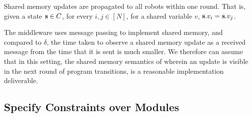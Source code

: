 \begin{assumption}
    \label{shared}
    Shared memory updates are propagated to all robots within one round. That is, given a state ${\textbf{s}}\in C$, for every  $i,j \in [N]$, for a shared variable $v$, ${\textbf{s}}.v_i = {\textbf{s}}.v_j$.
\end{assumption}
The \lgname middleware uses message passing to implement shared memory, and compared to $\delta$, the time taken to observe a shared memory update as a received message from the time that it is sent is much smaller. We therefore can assume that in this setting, the shared memory semantics of \lgname wherein an update is visible in the next round of program transitions, is a reasonable implementation deliverable.



\subsection{Specify Constraints over Modules}
\label{sec:module}
